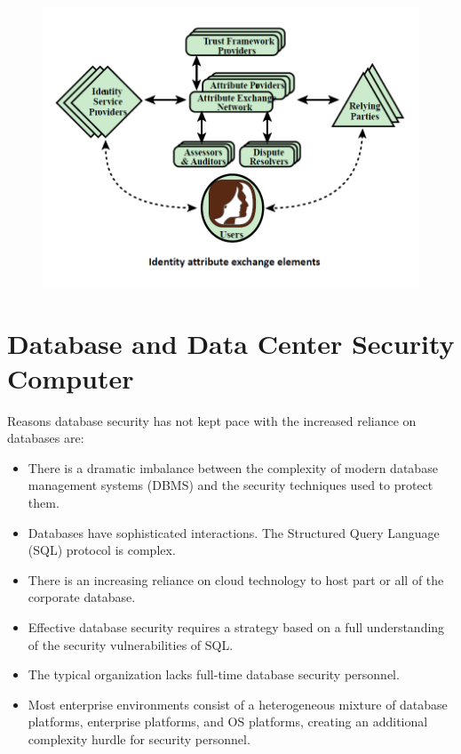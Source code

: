 \documentclass{article}
\begin{document}
                                    \begin{figure}[h]
                                        \centering
                                        \includegraphics[scale=0.5]{../immagini/identity_information_exchange2.png}
                                       
                                    \end{figure}
                                    \newpage
\section{Database and
Data Center Security
Computer}
                Reasons database
                security has not
                kept pace with the
                increased reliance
                on databases are:   \\                 
                \begin{itemize}
                    \item There is a dramatic imbalance between the complexity of modern database management systems (DBMS) and the security techniques used to protect them.
                    \item Databases have sophisticated interactions. The Structured Query Language (SQL) protocol is complex.
                    \item There is an increasing reliance on cloud technology to host part or all of the corporate database.
                    \item Effective database security requires a strategy based on a full understanding of the security vulnerabilities of SQL.
                    \item The typical organization lacks full-time database security personnel.
                    \item Most enterprise environments consist of a heterogeneous mixture of database platforms, enterprise platforms, and OS platforms, creating an additional complexity hurdle for security personnel.
                \end{itemize}
            
\end{document}
